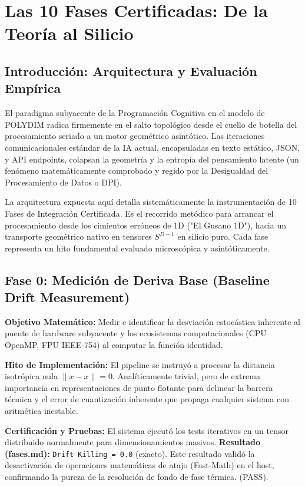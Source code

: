 \chapter{Las 10 Fases Certificadas: De la Teoría al Silicio}

\section{Introducción: Arquitectura y Evaluación Empírica}

El paradigma subyacente de la Programación Cognitiva en el modelo de POLYDIM radica firmemente en el salto topológico desde el cuello de botella del procesamiento seriado a un motor geométrico asintótico. Las iteraciones comunicacionales estándar de la IA actual, encapsuladas en texto estático, JSON, y API endpoints, colapsan la geometría y la entropía del pensamiento latente (un fenómeno matemáticamente comprobado y regido por la Desigualdad del Procesamiento de Datos o DPI).

La arquitectura expuesta aquí detalla sistemáticamente la instrumentación de 10 Fases de Integración Certificada. Es el recorrido metódico para arrancar el procesamiento desde los cimientos erróneos de 1D ("El Gusano 1D"), hacia un transporte geométrico nativo en tensores $S^{D-1}$ en silicio puro. Cada fase representa un hito fundamental evaluado microscópica y asintóticamente.

\section{Fase 0: Medición de Deriva Base (Baseline Drift Measurement)}

\textbf{Objetivo Matemático:} Medir e identificar la desviación estocástica inherente al puente de hardware subyacente y los ecosistemas computacionales (CPU OpenMP, FPU IEEE-754) al computar la función identidad.

\textbf{Hito de Implementación:} El pipeline se instruyó a procesar la distancia isotrópica nula $\lVert x - x \rVert = 0$. Analíticamente trivial, pero de extrema importancia en representaciones de punto flotante para delinear la barrera térmica y el error de cuantización inherente que propaga cualquier sistema con aritmética inestable. 

\textbf{Certificación y Pruebas:} El sistema ejecutó los tests iterativos en un tensor distribuido normalmente para dimensionamientos masivos.
\textbf{Resultado (fases.md):} \texttt{Drift Killing = 0.0} (exacto). Este resultado validó la desactivación de operaciones matemáticas de atajo (Fast-Math) en el host, confirmando la pureza de la resolución de fondo de fase térmica. (PASS).

